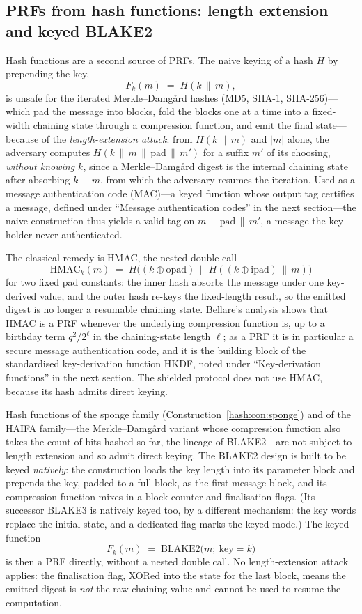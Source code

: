 \documentclass[11pt,a4paper]{article}
\theoremstyle{definition}
\theoremstyle{remark}
\providecommand{\abs}[1]{\lvert #1 \rvert}
\begin{document}
\subsection{PRFs from hash functions: length extension and keyed
BLAKE2}\label{prf:subsec:hmac}

Hash functions are a second source of PRFs. The naive keying of a hash
\(H\) by prepending the key,
\[
F_{k}(m) \;=\; H(k \,\|\, m),
\]
is unsafe for the iterated Merkle--Damg\aa rd hashes (MD5, SHA-1,
SHA-256)---which pad the message into blocks, fold the blocks one at
a time into a fixed-width chaining state through a compression
function, and emit the final state---because of the
\emph{length-extension attack}: from
\(H(k \,\|\, m)\) and \(\abs{m}\) alone, the adversary computes
\(H(k \,\|\, m \,\|\, \mathrm{pad} \,\|\, m')\) for a suffix \(m'\) of
its choosing, \emph{without knowing \(k\)}, since a Merkle--Damg\aa rd
digest is the internal chaining state after absorbing
\(k \,\|\, m\), from which the adversary resumes the iteration. Used as a
message authentication code (MAC)---a keyed function whose output tag
certifies a message, defined under ``Message authentication codes'' in
the next section---the naive construction thus yields a valid tag on
\(m \,\|\, \mathrm{pad} \,\|\, m'\), a message the key holder never
authenticated.

The classical remedy is HMAC, the nested double call
\[
\mathrm{HMAC}_{k}(m)
\;=\;
H\bigl((k \oplus \mathrm{opad}) \,\|\,
       H((k \oplus \mathrm{ipad}) \,\|\, m)\bigr)
\]
for two fixed pad constants: the inner hash absorbs the message under
one key-derived value, and the outer hash re-keys the fixed-length
result, so the emitted digest is no longer a resumable chaining state.
Bellare's analysis shows that HMAC is a PRF whenever the underlying
compression function is, up to a birthday term \(q^{2}/2^{\ell}\) in
the chaining-state length \(\ell\); as a PRF it is in particular a
secure message authentication code, and it is the building block of
the standardised key-derivation function HKDF, noted under
``Key-derivation functions'' in the next section. The shielded protocol
does not use HMAC, because its hash admits direct keying.

Hash functions of the sponge family
(Construction~\ref{hash:con:sponge}) and of the HAIFA family---the
Merkle--Damg\aa rd variant whose compression function also takes the
count of bits hashed so far, the lineage of BLAKE2---are not subject to
length extension and so admit direct keying. The BLAKE2 design
is built to be keyed \emph{natively}: the construction loads the key
length into its parameter block and prepends the key, padded to a
full block, as the first message block, and its compression function
mixes in a block counter and finalisation flags. (Its successor
BLAKE3 is natively keyed too, by a different mechanism: the key words
replace the initial state, and a dedicated flag marks the keyed
mode.) The keyed function
\[
F_{k}(m) \;=\; \mathrm{BLAKE2}\bigl(m;\ \mathrm{key} = k\bigr)
\]
is then a PRF directly, without a nested double call. No
length-extension attack applies: the finalisation flag,
XORed into the state for the last block, means the emitted digest is
\emph{not} the raw chaining value and cannot be used to resume the
computation.
\end{document}
